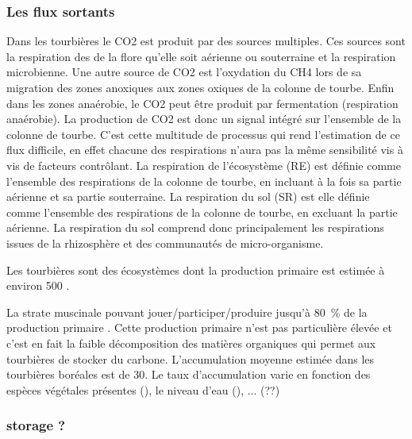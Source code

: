 

\subsubsection{Les flux sortants}
Dans les tourbières le CO2 est produit par des sources multiples.
Ces sources sont la respiration des de la flore qu'elle soit aérienne ou souterraine et la respiration microbienne.
Une autre source de CO2 est l'oxydation du CH4 lors de sa migration des zones anoxiques aux zones oxiques de la colonne de tourbe.
Enfin dans les zones anaérobie, le CO2 peut être produit par fermentation (respiration anaérobie).
La production de CO2 est donc un signal intégré sur l'ensemble de la colonne de tourbe. 
C'est cette multitude de processus qui rend l'estimation de ce flux difficile, en effet chacune des respirations n'aura pas la même sensibilité vis à vis de facteurs contrôlant.
La respiration de l'écosystème (RE) est définie comme l'ensemble des respirations de la colonne de tourbe, en incluant à la fois sa partie aérienne et sa partie souterraine.
La respiration du sol (SR) est elle définie comme l'ensemble des respirations de la colonne de tourbe, en excluant la partie aérienne.
La respiration du sol comprend donc principalement les respirations issues de la rhizosphère et des communautés de micro-organisme.

Les tourbières sont des écosystèmes dont la production primaire est estimée à environ \SI{500}{\gcm} \cite{francez2000}. 


La strate muscinale pouvant jouer/participer/produire jusqu'à \SI{80}{\percent} de la production primaire \cite{francez2000}.
Cette production primaire n'est pas particulière élevée \plop et c'est en fait la faible décomposition des matières organiques qui permet aux tourbières de stocker du carbone.
L'accumulation moyenne estimée dans les tourbières boréales est de \SI{30}{\gcm}. Le taux d'accumulation varie en fonction des espèces végétales présentes (\plop), le niveau d'eau (\plop), ... (??)



\subsubsection{storage ?}

